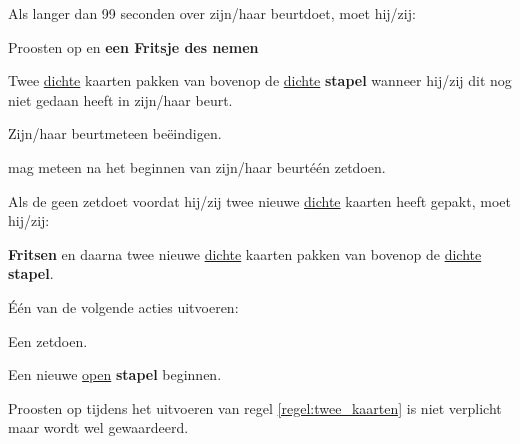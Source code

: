 \newpage
{}
\label{sec:beurten_en_zetten_start}


\vervolgLijst{}
    \item Als \eenSpeler langer dan 99 seconden over zijn/haar beurt\footnotemark[1] doet, moet hij/zij:
    \puntLijst{}
        \item Proosten op  en \textbf{een Fritsje des nemen}\footnotemark[2]
        \item Twee \ul{dichte} kaarten pakken van bovenop de \ul{dichte} \textbf{stapel} wanneer hij/zij dit nog niet gedaan heeft in zijn/haar beurt.
        \item Zijn/haar beurt\footnotemark[1] meteen beëindigen.
    \eindPuntLijst{}
    \label{regel:beurt_langer_dan_99}
\eindLijst{}


\vervolgLijst{}
    \item \EenSpeler mag meteen na het beginnen van zijn/haar beurt\footnotemark[1] \'e\'en zet\footnotemark[3] doen.
\eindLijst{}

\vervolgLijst{}
    \item \label{regel:twee_kaarten} Als de \huidigeSpeler geen zet\footnotemark[3] doet voordat hij/zij twee nieuwe \ul{dichte} kaarten heeft gepakt, moet hij/zij:
    \puntLijst{}
        \item \textbf{Fritsen} en daarna twee nieuwe \ul{dichte} kaarten pakken van bovenop de \ul{dichte} \textbf{stapel}.
        \item Één van de volgende acties uitvoeren:
        \numeriekeLijst{}
            \item Een zet\footnotemark[3] doen.
            \item Een nieuwe \ul{open} \textbf{stapel} beginnen.
        \eindNumeriekeLijst{}
     \eindPuntLijst{}
\eindLijst{}

\vervolgLijst{}
    \item Proosten op  tijdens het uitvoeren van regel \ref{regel:twee_kaarten} is niet verplicht maar wordt wel gewaardeerd.
\eindLijst{}

